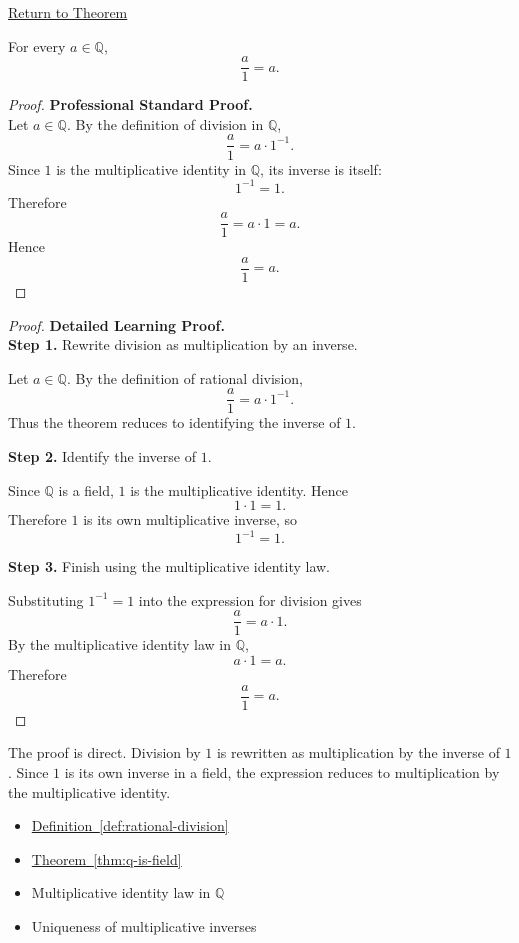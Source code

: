 \newpage
{}
\label{prf:rational-division-by-one}

\begin{remark*}[Return]
\hyperref[thm:rational-division-by-one]{Return to Theorem}
\end{remark*}

\begin{theorem*}
For every $a\in\mathbb{Q}$,
\[
\frac{a}{1}=a.
\]
\end{theorem*}

\begin{proof}
\textbf{Professional Standard Proof.}~\\
Let $a\in\mathbb{Q}$. By the definition of division in $\mathbb{Q}$,
\[
\frac{a}{1}=a\cdot 1^{-1}.
\]
Since $1$ is the multiplicative identity in $\mathbb{Q}$, its inverse is
itself:
\[
1^{-1}=1.
\]
Therefore
\[
\frac{a}{1}=a\cdot 1=a.
\]
Hence
\[
\frac{a}{1}=a.
\]
\end{proof}

\begin{proof}
\textbf{Detailed Learning Proof.}~\\

\textbf{Step 1.} Rewrite division as multiplication by an inverse.

Let $a\in\mathbb{Q}$. By the definition of rational division,
\[
\frac{a}{1}=a\cdot 1^{-1}.
\]
Thus the theorem reduces to identifying the inverse of $1$.

\textbf{Step 2.} Identify the inverse of $1$.

Since $\mathbb{Q}$ is a field, $1$ is the multiplicative identity. Hence
\[
1\cdot 1=1.
\]
Therefore $1$ is its own multiplicative inverse, so
\[
1^{-1}=1.
\]

\textbf{Step 3.} Finish using the multiplicative identity law.

Substituting $1^{-1}=1$ into the expression for division gives
\[
\frac{a}{1}=a\cdot 1.
\]
By the multiplicative identity law in $\mathbb{Q}$,
\[
a\cdot 1=a.
\]
Therefore
\[
\frac{a}{1}=a.
\]
\end{proof}

\begin{remark*}
The proof is direct. Division by $1$ is rewritten as multiplication by
the inverse of $1$. Since $1$ is its own inverse in a field, the expression
reduces to multiplication by the multiplicative identity.
\end{remark*}

\begin{dependencies}
\begin{itemize}
  \item \hyperref[def:rational-division]{Definition~\ref*{def:rational-division}}
  \item \hyperref[thm:q-is-field]{Theorem~\ref*{thm:q-is-field}}
  \item Multiplicative identity law in $\mathbb{Q}$
  \item Uniqueness of multiplicative inverses
\end{itemize}
\end{dependencies}
